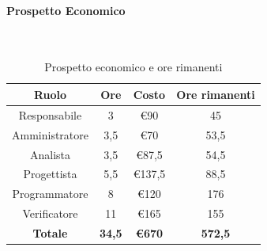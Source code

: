 \documentclass{article}
\begin{document}
                \paragraph{Prospetto Economico}\mbox{}\\
                \begin{table}[H]
                    \centering
                    \begin{tabular}{|c|c|c|c|}
                    \hline
                    \textbf{Ruolo}  & \textbf{Ore}  & \textbf{Costo} & \textbf{Ore rimanenti} \\ \hline
                    Responsabile    & 3             & €90            & 45                     \\ \hline
                    Amministratore  & 3,5           & €70            & 53,5                   \\ \hline
                    Analista        & 3,5           & €87,5          & 54,5                   \\ \hline
                    Progettista     & 5,5           & €137,5         & 88,5                   \\ \hline
                    Programmatore   & 8            & €120           & 176                    \\ \hline
                    Verificatore    & 11            & €165           & 155                    \\ \hline
                    \textbf{Totale} & \textbf{34,5} & \textbf{\euro670}   & \textbf{572,5}         \\ \hline
                    \end{tabular}
                    \caption{Prospetto economico e ore rimanenti}
                \end{table}
\end{document}
